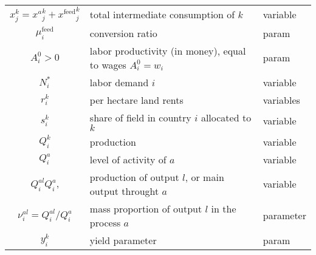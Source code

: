 \begin{table}[h!]
\begin{tabular}{c|l|l}
        ${x}_j^k = {x^a}_j^k + {x^\text{feed}}_j^k$ & total intermediate consumption of $k$                              & variable                          \\

        ${\mu_i^\text{feed}}$                       & conversion ratio                                                   & param                             \\

        $A_i^0 > 0$                                 & labor productivity (in money), equal to wages $A_i^0 = w_i$        & param                             \\

        $N_i^*$                                     & labor demand $i$                                                   & variable                          \\

        $r_i^k$                                     & per hectare land rents                                             & variables                         \\

        $s_i^k$                                     & share of field in country $i$ allocated to $k$                     & variable                          \\

        $Q_i^k$                                     & production                                                         & variable                          \\

        $Q_i^a$                                     & level of activity of $a$                                           & variable                          \\

        $Q_i^{al} Q_i^{a}$,                         & production of output $l$, or main output throught $a$              & variable                          \\

        $\nu_i^{al} = Q_i^{al} / Q_i^a$             & mass proportion of output $l$ in the process $a$                   & parameter                         \\

        $y_i^k$                                     & yield parameter                                                    & param                             \\


\end{tabular}
\end{table}
